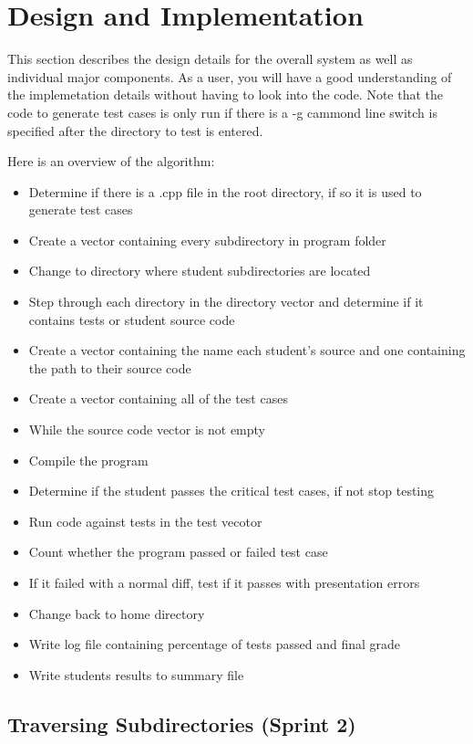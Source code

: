 \chapter{Design  and Implementation}
 This section describes the design details for the overall system as well as individual major components. As a user, you will have a good understanding of the implemetation details without having to look into the code. Note that the
 code to generate test cases is only run if there is a -g cammond line switch is specified after the directory to test is entered.

 Here is an overview of the algorithm:

\begin{itemize}
  \item Determine if there is a .cpp file in the root directory, if so it is used to generate test cases
  \item Create a vector containing every subdirectory in program folder
  \item Change to directory where student subdirectories are located
  \item Step through each directory in the directory vector and determine if it contains tests or student source code
  \item Create a vector containing the name each student's source and one containing the path to their source code
  \item Create a vector containing all of the test cases
  \item While the source code vector is not empty
  \item Compile the program
  \item Determine if the student passes the critical test cases, if not stop testing
  \item Run code against tests in the test vecotor
  \item Count whether the program passed or failed test case
  \item If it failed with a normal diff, test if it passes with presentation errors
  \item Change back to home directory 
  \item Write log file containing percentage of tests passed and final grade
  \item Write students results to summary file
\end{itemize}


\section{Traversing Subdirectories (Sprint 2)}

